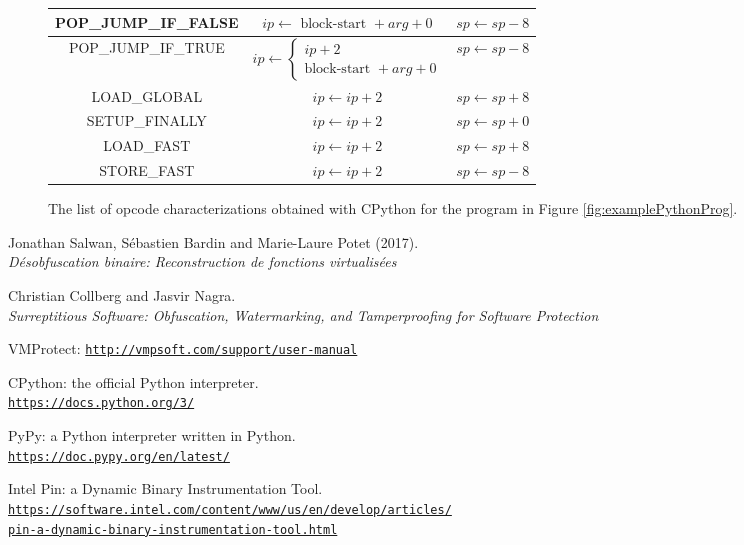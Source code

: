 \documentclass[english]{article}
\begin{document}
\begin{figure}[htp]
\begin{tabular}{|c|c|c|}
		\hline
		POP\_JUMP\_IF\_FALSE & $ip \leftarrow \textrm{ block-start } + arg + 0$ & $sp \leftarrow sp - 8$\\
		\hline
		POP\_JUMP\_IF\_TRUE & 
		$ip \leftarrow 
		\left\{ 
		\begin{array}{ll}
		ip + 2 \\ 
		\textrm{block-start } + arg + 0
		\end{array}
		\right.$ & $sp \leftarrow sp - 8$\\
		\hline
		LOAD\_GLOBAL & $ip \leftarrow ip + 2$ & $sp \leftarrow sp + 8$\\
		\hline
		SETUP\_FINALLY & $ip \leftarrow ip + 2$ & $sp \leftarrow sp + 0$\\
		\hline
		LOAD\_FAST & $ip \leftarrow ip + 2$ & $sp \leftarrow sp + 8$\\
		\hline
		STORE\_FAST & $ip \leftarrow ip + 2$ & $sp \leftarrow sp - 8$\\
		\hline
	\end{tabular}
	\caption{The list of opcode characterizations obtained with CPython for the program in Figure \ref{fig:examplePythonProg}.}
	\label{fig:semanticsTable}
\end{figure}



\begin{thebibliography}{9}
	Jonathan Salwan, Sébastien Bardin and Marie-Laure Potet (2017).
	\\\textit{Désobfuscation binaire: Reconstruction de fonctions virtualisées}
	
	Christian Collberg and Jasvir Nagra.
	\\\textit{Surreptitious Software: Obfuscation, Watermarking, and Tamperproofing for Software Protection}
	
	VMProtect:
	\href{http://vmpsoft.com/support/user-manual}{\texttt{http://vmpsoft.com/support/user-manual}}
	
	CPython: the official Python interpreter.
	\href{https://docs.python.org/3/}{\\\texttt{https://docs.python.org/3/}}
	
	PyPy: a Python interpreter written in Python.
	\href{https://doc.pypy.org/en/latest/}{\\\texttt{https://doc.pypy.org/en/latest/}}
	
	Intel Pin: a Dynamic Binary Instrumentation Tool.
	\href{https://software.intel.com/content/www/us/en/develop/articles/pin-a-dynamic-binary-instrumentation-tool.html}{\\\texttt{https://software.intel.com/content/www/us/en/develop/articles/\\pin-a-dynamic-binary-instrumentation-tool.html}}
\end{thebibliography}
\end{document}
